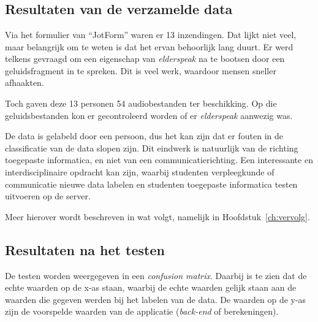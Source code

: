 
\chapter{}
\label{ch:resultaten}

\section{Resultaten van de verzamelde data}
Via het formulier van ``JotForm'' waren er 13 inzendingen. Dat lijkt niet veel, maar belangrijk om te weten is dat het ervan behoorlijk lang duurt. Er werd telkens gevraagd om een eigenschap van \textit{elderspeak} na te bootsen door een geluidsfragment in te spreken. Dit is veel werk, waardoor mensen sneller afhaakten.

Toch gaven deze 13 personen 54 audiobestanden ter beschikking. Op die geluidsbestanden kon er gecontroleerd worden of er \textit{elderspeak} aanwezig was.

De data is gelabeld door een persoon, dus het kan zijn dat er fouten in de classificatie van de data slopen zijn. Dit eindwerk is natuurlijk van de richting toegepaste informatica, en niet van een communicatierichting. Een interessante en interdisciplinaire opdracht kan zijn, waarbij studenten verpleegkunde of communicatie nieuwe data labelen en studenten toegepaste informatica testen uitvoeren op de server.

Meer hierover wordt beschreven in wat volgt, namelijk in Hoofdstuk~\ref{ch:vervolg}.

\section{Resultaten na het testen}
De testen worden weergegeven in een \textit{confusion matrix}. Daarbij is te zien dat de echte waarden op de x-as staan, waarbij de echte waarden gelijk staan aan de waarden die gegeven werden bij het labelen van de data. De waarden op de y-as zijn de voorspelde waarden van de applicatie (\textit{back-end} of berekeningen).

